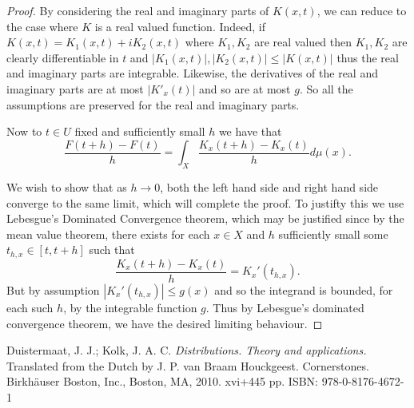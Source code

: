 \documentclass[twoside, a4paper, 10pt]{amsart}
\begin{document}
\begin{proof} By considering the real and imaginary parts of $K(x,t)$, we can reduce to the case where $K$ is a real valued function. Indeed, if $K(x,t) = K_1(x,t) + iK_2(x,t)$ where $K_1,K_2$ are real valued then $K_1,K_2$ are clearly differentiable in $t$ and $|K_1(x,t)|, |K_2(x,t)|  \leq |K(x,t)|$ thus the real and imaginary parts are integrable. Likewise, the derivatives of the real and imaginary parts are at most $|K'_x(t)|$ and so are at most $g$. So all the assumptions are preserved for the real and imaginary parts.

Now to $t \in U$ fixed and sufficiently small $h$ we have that $$\frac{F(t+h) - F(t)}{h} = \int_X \frac{K_x(t+h) - K_x(t)}{h} d\mu(x).$$

We wish to show that as $h \to 0$, both the left hand side and right hand side converge to the same limit, which will complete the proof. To justifty this we use Lebesgue's Dominated Convergence theorem, which may be justified since by the mean value theorem, there exists for each $x \in X$ and $h$ sufficiently small some $t_{h,x} \in [t,t+h]$ such that $$\frac{K_x(t+h) - K_x(t)}{h} = K_x'(t_{h,x}).$$ But by assumption $|K_x'(t_{h,x})| \leq g(x)$ and so the integrand is bounded, for each such $h$, by the integrable function $g$. Thus by Lebesgue's dominated convergence theorem, we have the desired limiting behaviour. \end{proof}


\begin{thebibliography}{99}

 Duistermaat, J. J.; Kolk, J. A. C. \emph{Distributions. Theory and applications.} Translated from the Dutch by J. P. van Braam Houckgeest. Cornerstones. Birkhäuser Boston, Inc., Boston, MA, 2010. xvi+445 pp. ISBN: 978-0-8176-4672-1 

\end{thebibliography} 
\end{document}
